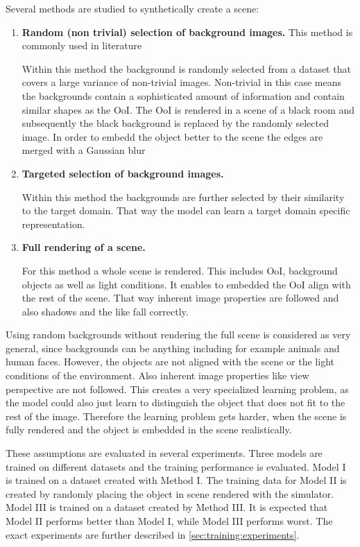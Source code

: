 Several methods are studied to synthetically create a scene:

\begin{enumerate}

\item \textbf{Random (non trivial) selection of background images.}
This method is commonly used in literature 

Within this method the background is randomly selected from a dataset that covers a large variance of non-trivial images. Non-trivial in this case means the backgrounds contain a sophisticated amount of information and contain similar shapes as the \ac{OoI}. The \ac{OoI} is rendered in a scene of a black room and subsequently the black background is replaced by the randomly selected image. In order to embedd the object better to the scene the edges are merged with a Gaussian blur 

\item \textbf{Targeted selection of background images.}

Within this method the backgrounds are further selected by their similarity to the target domain. That way the model can learn a target domain specific representation.

\item \textbf{Full rendering of a scene.}

For this method a whole scene is rendered. This includes \ac{OoI}, background objects as well as light conditions. It enables to embedded the \ac{OoI} align with the rest of the scene. That way inherent image properties are followed and also shadows and the like fall correctly.

\end{enumerate}

Using random backgrounds without rendering the full scene is considered as very general, since backgrounds can be anything including for example animals and human faces. However, the objects are not aligned with the scene or the light conditions of the environment. Also inherent image properties like view perspective are not followed. This creates a very specialized learning problem, as the model could also just learn to distinguish the object that does not fit to the rest of the image. Therefore the learning problem gets harder, when the scene is fully rendered and the object is embedded in the scene realistically.

These assumptions are evaluated in several experiments. Three models are trained on different datasets and the training performance is evaluated. Model I is trained on a dataset created with Method I. The training data for Model II is created by randomly placing the object in scene rendered with the simulator. Model III is trained on a dataset created by Method III. It is expected that Model II performs better than Model I, while Model III performs worst. The exact experiments are further described in \autoref{sec:training:experiments}.

